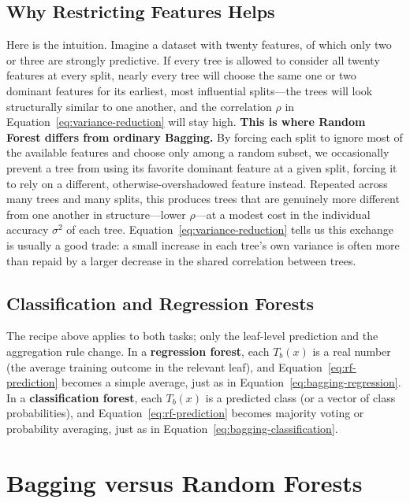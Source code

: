 \documentclass[12pt,a4paper]{article}
\begin{document}
\subsection{Why Restricting Features Helps}

Here is the intuition. Imagine a dataset with twenty features, of which only two or three are strongly predictive. If every tree is allowed to consider all twenty features at every split, nearly every tree will choose the same one or two dominant features for its earliest, most influential splits---the trees will look structurally similar to one another, and the correlation $\rho$ in Equation~\eqref{eq:variance-reduction} will stay high. \textbf{This is where Random Forest differs from ordinary Bagging.} By forcing each split to ignore most of the available features and choose only among a random subset, we occasionally prevent a tree from using its favorite dominant feature at a given split, forcing it to rely on a different, otherwise-overshadowed feature instead. Repeated across many trees and many splits, this produces trees that are genuinely more different from one another in structure---lower $\rho$---at a modest cost in the individual accuracy $\sigma^2$ of each tree. Equation~\eqref{eq:variance-reduction} tells us this exchange is usually a good trade: a small increase in each tree's own variance is often more than repaid by a larger decrease in the shared correlation between trees.

\subsection{Classification and Regression Forests}

The recipe above applies to both tasks; only the leaf-level prediction and the aggregation rule change. In a \textbf{regression forest}, each $T_b(x)$ is a real number (the average training outcome in the relevant leaf), and Equation~\eqref{eq:rf-prediction} becomes a simple average, just as in Equation~\eqref{eq:bagging-regression}. In a \textbf{classification forest}, each $T_b(x)$ is a predicted class (or a vector of class probabilities), and Equation~\eqref{eq:rf-prediction} becomes majority voting or probability averaging, just as in Equation~\eqref{eq:bagging-classification}.

\section{Bagging versus Random Forests}
\label{sec:bagging-vs-rf}
\end{document}
